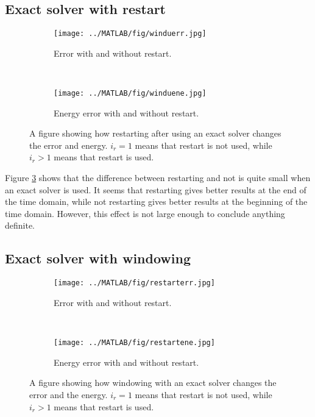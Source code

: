 \subsection{Exact solver with restart} %
\begin{figure}[H]
		\begin{subfigure}[b]{0.45\textwidth}
                \texttt{[image: ../MATLAB/fig/winduerr.jpg]}
                \caption{ Error with and without restart. }
                \label{fig:winduerr}
        \end{subfigure}%
        ~
        \begin{subfigure}[b]{0.45\textwidth}
                \texttt{[image: ../MATLAB/fig/winduene.jpg]}
                \caption{ Energy error with and without restart. }
                \label{fig:winduene}
        \end{subfigure}
\caption{A figure showing how restarting after using an exact solver changes the error and energy. $i_r = 1$ means that restart is not used, while $i_r > 1$ means that restart is used. }        
\label{fig:windu}
\end{figure}

\noindent Figure \ref{fig:windu} shows that the difference between restarting and not is quite small when an exact solver is used. It seems that restarting gives better results at the end of the time domain, while not restarting gives better results at the beginning of the time domain. However, this effect is not large enough to conclude anything definite.

\subsection{Exact solver with windowing}%
\begin{figure}[H]
		\begin{subfigure}[b]{0.45\textwidth}
                \texttt{[image: ../MATLAB/fig/restarterr.jpg]}
                \caption{ Error with and without restart. }
                \label{fig:restarterr}
        \end{subfigure}
        ~
        \begin{subfigure}[b]{0.45\textwidth}
                \texttt{[image: ../MATLAB/fig/restartene.jpg]}
                \caption{ Energy error with and without restart. }
                \label{fig:restartene}
        \end{subfigure}
\caption{A figure showing how windowing with an exact solver changes the error and the energy. $i_r = 1$ means that restart is not used, while $i_r > 1$ means that restart is used. }        
\label{fig:restart}
\end{figure}

